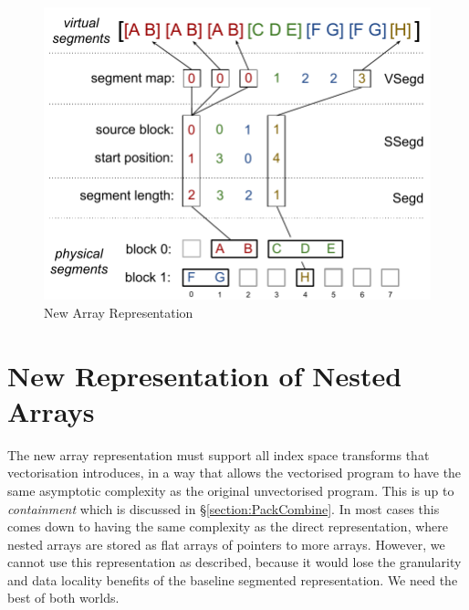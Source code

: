 
\begin{figure}
\begin{center}
\includegraphics[scale=0.6]{figures/NewArrayRep}
\caption{New Array Representation}
\end{center}
\label{figure:NewArrayPicture}
\end{figure}

\eject{}

\section{New Representation of Nested Arrays}
\label{section:Segds}

The new array representation must support all index space transforms that vectorisation introduces, in a way that allows the vectorised program to have the same asymptotic complexity as the original unvectorised program. This is up to \emph{containment} which is discussed in \S\ref{section:PackCombine}. In most cases this comes down to having the same complexity as the direct representation, where nested arrays are stored as flat arrays of pointers to more arrays. However, we cannot use this representation as described, because it would lose the granularity and data locality benefits of the baseline segmented representation. We need the best of both worlds.


